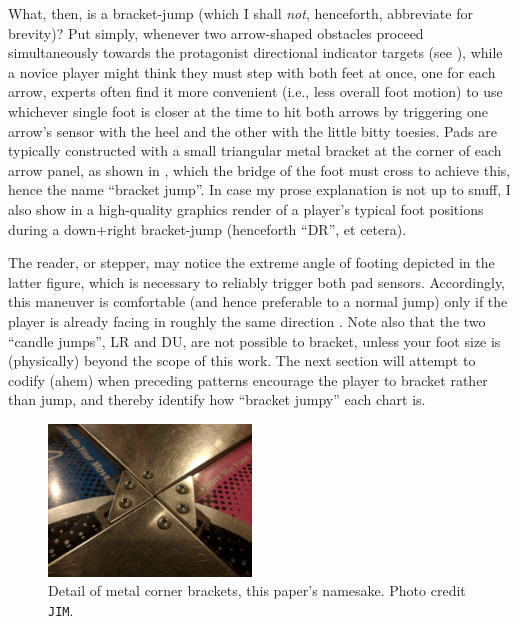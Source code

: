 \documentclass[10pt]{sigplanconf}
\begin{document}

What, then, is a bracket-jump (which I shall \textit{not}, henceforth, abbreviate for brevity)?
Put simply, whenever two arrow-shaped obstacles proceed simultaneously towards the protagonist directional indicator targets
(see \cite{turniness}),
while a novice player might think they must step with both feet at once, one for each arrow,
experts often find it more convenient (i.e., less overall foot motion) to use whichever single foot is closer at the time
to hit both arrows by
triggering one arrow's sensor with the heel and the other with the little bitty toesies.
Pads are typically constructed with a small triangular metal bracket at the corner of each arrow panel,
as shown in ,
which the bridge of the foot must cross to achieve this, hence the name ``bracket jump''.
In case my prose explanation is not up to snuff, I also show in 
a high-quality graphics render of a player's typical foot positions during a down+right bracket-jump (henceforth ``DR'', et cetera).

The reader, or stepper,
may notice the extreme angle of footing depicted in the latter figure,
which is necessary to reliably trigger both pad sensors.
Accordingly, this maneuver is comfortable (and hence preferable to a normal jump)
only if the player is already facing in roughly the same direction \cite{turniness}.
Note also that the two ``candle jumps'', LR and DU, are not possible to bracket,
unless your foot size is (physically) beyond the scope of this work.
The next section will attempt to codify (ahem) when
preceding patterns encourage the player to bracket rather than jump,
and thereby identify how ``bracket jumpy'' each chart is.

\begin{figure}[t]
	\begin{center}
		\includegraphics[width=0.48\textwidth]{jims-pix.jpg}
	\end{center}
	\caption{Detail of metal corner brackets, this paper's namesake. Photo credit {\tt JIM}.}
	\label{fig:bracker-detail}
\end{figure}
\end{document}
